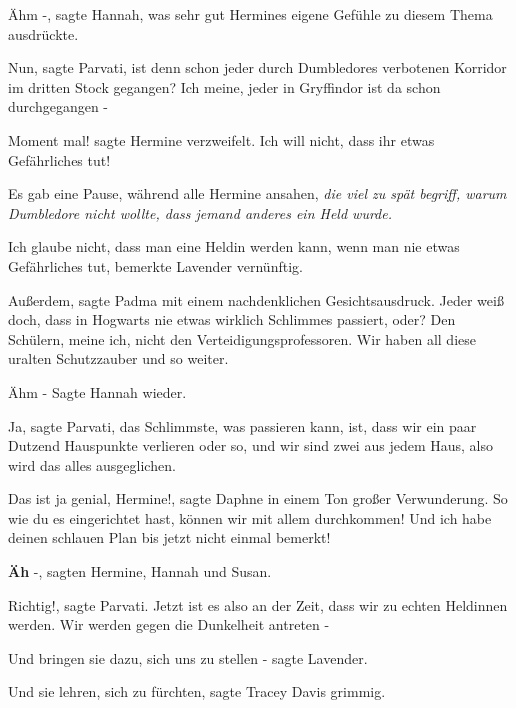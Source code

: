 \glqq Ähm -\grqq{}, sagte Hannah, was sehr gut Hermines eigene Gefühle zu diesem
Thema ausdrückte.

\glqq Nun\grqq{}, sagte Parvati, \glqq ist denn schon jeder durch Dumbledores
verbotenen Korridor im dritten Stock gegangen? Ich meine, jeder in Gryffindor
ist da schon durchgegangen -\grqq{}

\glqq Moment mal!\grqq{} sagte Hermine verzweifelt. \glqq Ich will nicht, dass
ihr etwas Gefährliches tut!\grqq{}

Es gab eine Pause, während alle Hermine ansahen, \emph{die viel zu spät begriff,
warum Dumbledore nicht wollte, dass jemand anderes ein Held wurde.}

\glqq Ich glaube nicht, dass man eine Heldin werden kann, wenn man nie etwas
Gefährliches tut\grqq{}, bemerkte Lavender vernünftig.

\glqq Außerdem\grqq{}, sagte Padma mit einem nachdenklichen Gesichtsausdruck.
\glqq Jeder weiß doch, dass in Hogwarts nie etwas wirklich Schlimmes passiert,
oder? Den Schülern, meine ich, nicht den Verteidigungsprofessoren. Wir haben all
diese uralten Schutzzauber und so weiter.\grqq{}

\glqq Ähm -\grqq{} Sagte Hannah wieder.

\glqq Ja\grqq{}, sagte Parvati, \glqq das Schlimmste, was passieren kann, ist,
dass wir ein paar Dutzend Hauspunkte verlieren oder so, und wir sind zwei aus
jedem Haus, also wird das alles ausgeglichen.\grqq{}

\glqq Das ist ja genial, Hermine!\grqq{}, sagte Daphne in einem Ton großer
Verwunderung. \glqq So wie du es eingerichtet hast, können wir mit allem
durchkommen! Und ich habe deinen schlauen Plan bis jetzt nicht einmal
bemerkt!\grqq{}

\glqq \textbf{Äh} -\grqq{}, sagten Hermine, Hannah und Susan.

\glqq Richtig!\grqq{}, sagte Parvati. \glqq Jetzt ist es also an der Zeit, dass
wir zu echten Heldinnen werden. Wir werden gegen die Dunkelheit antreten
-\grqq{}

\glqq Und bringen sie dazu, sich uns zu stellen -\grqq{} sagte Lavender.

\glqq Und sie lehren, sich zu fürchten\grqq{}, sagte Tracey Davis grimmig.

